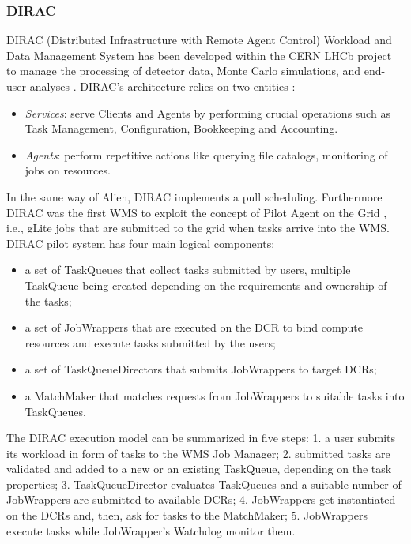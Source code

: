 \subsubsection{DIRAC}

DIRAC (Distributed Infrastructure with Remote Agent Control) Workload and Data
Management System has been developed within the CERN LHCb project to manage the
processing of detector data, Monte Carlo simulations, and end-user analyses
\cite{Tsaregorodtsev2004}. DIRAC's architecture relies on two entities
\cite{Paterson2010}:

\begin{itemize}
    \item \emph{Services}: serve Clients and Agents by performing crucial
    operations such as Task Management, Configuration, Bookkeeping and
    Accounting.
    \item \emph{Agents}: perform repetitive actions like querying file
    catalogs, monitoring of jobs on resources.
\end{itemize}

In the same way of Alien, DIRAC implements a pull scheduling. Furthermore DIRAC
was the first WMS to exploit the concept of Pilot Agent on the Grid
\cite{Casajus2010}, i.e., gLite jobs that are submitted to the grid when tasks
arrive into the WMS. DIRAC pilot system has four main logical components:

\begin{itemize}
    \item a set of TaskQueues that collect tasks submitted by users, multiple
    TaskQueue being created depending on the requirements and ownership of the
    tasks;
    \item a set of JobWrappers that are executed on the DCR to bind compute
    resources and execute tasks submitted by the users;
    \item a set of TaskQueueDirectors that submits JobWrappers to target DCRs;
    \item a MatchMaker that matches requests from JobWrappers to suitable tasks
    into TaskQueues.
\end{itemize}

The DIRAC execution model can be summarized in five steps: 1. a user submits its
workload in form of tasks to the WMS Job Manager; 2. submitted tasks are
validated and added to a new or an existing TaskQueue, depending on the task
properties; 3. TaskQueueDirector evaluates TaskQueues and a suitable number of
JobWrappers are submitted to available DCRs; 4. JobWrappers get instantiated on
the DCRs and, then, ask for tasks to the MatchMaker; 5. JobWrappers execute
tasks while JobWrapper’s Watchdog monitor them.

